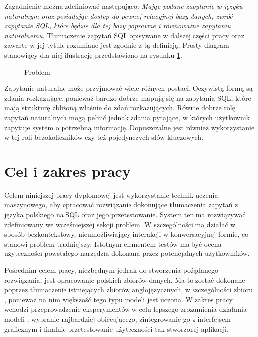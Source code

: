 Zagadnienie  można zdefiniować następująco: \textit{Mając podane zapytanie w języku naturalnym oraz posiadając dostęp do pewnej relacyjnej bazy danych, zwróć zapytanie SQL, które będzie dla tej bazy poprawne i równoważne zapytaniu naturalnemu}. Tłumaczenie zapytań SQL opisywane w dalszej części pracy oraz zawarte w jej tytule rozumiane jest zgodnie z tą definicją. Prosty diagram stanowiący dla niej ilustrację przedstawiono na rysunku \ref{fig:text-to-sql}.

\begin{figure}[ht!]
  \centering
  
  \caption{Problem }
  \label{fig:text-to-sql}
\end{figure}

Zapytanie naturalne może przyjmować wiele różnych postaci. Oczywistą formą są zdania rozkazujące, ponieważ bardzo dobrze mapują się na zapytania SQL, które mają strukturę zbliżoną właśnie do zdań rozkazujących. Równie dobrze rolę zapytań naturalnych mogą pełnić jednak zdania pytające, w których użytkownik zapytuje system o potrzebną informację. Dopuszczalne jest również wykorzystanie w tej roli bezokoliczników czy też pojedynczych słów kluczowych.

\section{Cel i zakres pracy}
Celem niniejszej pracy dyplomowej jest wykorzystanie technik uczenia maszynowego, aby opracować rozwiązanie dokonujące tłumaczenia zapytań z języka polskiego na SQL oraz jego przetestowanie. System ten ma rozwiązywać zdefiniowany we wcześniejszej sekcji problem. W szczególności ma działać w sposób bezkontekstowy, nieumożliwiający interakcji w konwersacyjnej formie, co stanowi problem trudniejszy. Istotnym elementem testów ma być ocena użyteczności powstałego narzędzia dokonana przez potencjalnych użytkowników.

Pośrednim celem pracy, niezbędnym jednak do stworzenia pożądanego rozwiązania, jest opracowanie polskich zbiorów danych. Ma to zostać dokonane poprzez tłumaczenie istniejących zbiorów anglojęzycznych, w szczególności zbioru , ponieważ na nim większość tego typu modeli jest uczona. W zakres pracy wchodzi przeprowadzenie eksperymentów w celu lepszego zrozumienia działania modeli , wybranie najbardziej obiecującego, zintegrowanie go z interfejsem graficznym i finalnie przetestowanie użyteczności tak stworzonej aplikacji.

